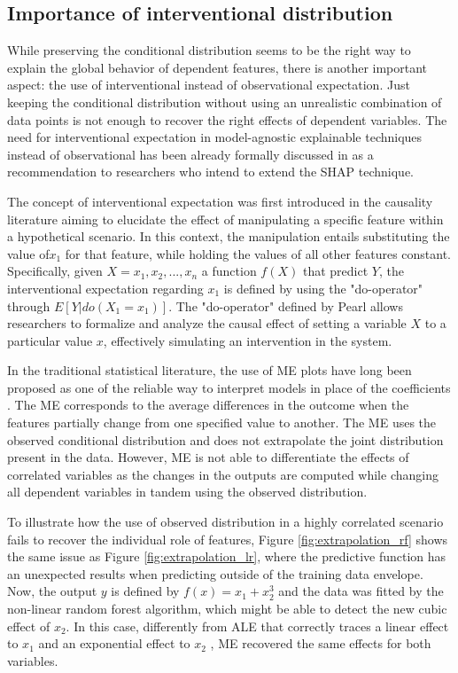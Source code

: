 
\subsection{Importance of interventional distribution}
\label{intervention}

While preserving the conditional distribution seems to be the right way to explain the global behavior of dependent features, there is another important aspect: the use of interventional instead of observational expectation. Just keeping the conditional distribution without using an unrealistic combination of data points is not enough to recover the right effects of dependent variables. The need for interventional expectation in model-agnostic explainable techniques instead of observational has been already formally discussed in \cite{Janzing2020FeatureProblem} as a recommendation to researchers who intend to extend the SHAP technique. 

The concept of interventional expectation was first introduced in the causality literature \cite{Pearl1993BayesianIntervention} aiming to elucidate the effect of manipulating a specific feature within a hypothetical scenario. In this context, the manipulation entails substituting the value of$x_1$ for that feature, while holding the values of all other features constant. Specifically, given $X={x_1, x_2,...,x_n}$ a function $f(X)$ that predict $Y$, the interventional expectation regarding $x_1$ is defined by using the "do-operator" through \(E[Y | do(X_{1} = x_{1})]\). The "do-operator" defined by Pearl allows researchers to formalize and analyze the causal effect of setting a variable \(X\) to a particular value \(x\), effectively simulating an intervention in the system.  

In the traditional statistical literature, the use of ME plots have long been proposed as one of the reliable way to interpret models in place of the coefficients \cite{long1997regression}. The ME corresponds to the average differences in the outcome when the features partially change from one speciﬁed value to another. The ME uses the observed conditional distribution and does not extrapolate the joint distribution present in the data. However, ME is not able to differentiate the effects of correlated variables as the changes in the outputs are computed while changing all dependent variables in tandem using the observed distribution.

To illustrate how the use of observed distribution in a highly correlated scenario fails to recover the individual role of features, Figure \ref{fig:extrapolation_rf} shows the same issue as Figure \ref{fig:extrapolation_lr}, where the predictive function has an unexpected results when predicting outside of the training data envelope. Now, the output $y$ is defined by $f(x) = x_1 + x_2^3$ and the data was fitted by the non-linear random forest algorithm, which might be able to detect the new cubic effect of $x_2$. In this case, differently from ALE that correctly traces a linear effect to $x_1$ and an exponential effect to $x_2$ , ME recovered the same effects for both variables. 

